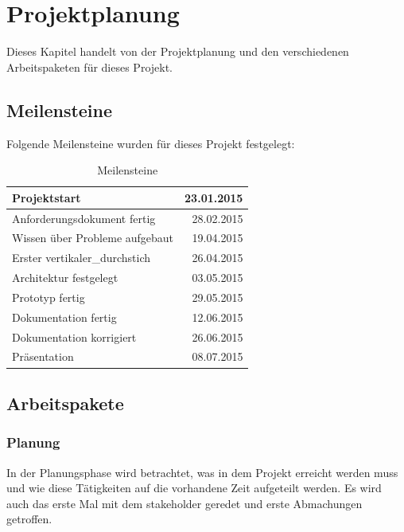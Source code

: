%
%

\chapter{Projektplanung}\label{chap.projektplanung}
Dieses Kapitel handelt von der Projektplanung und den verschiedenen Arbeitspaketen für dieses Projekt.

\section{Meilensteine}\label{meilensteine}
Folgende Meilensteine wurden für dieses Projekt festgelegt:

\begin{table}[ht]
\centering
  \begin{tabular}{ l | r }
	\hline
	\rowcolor{gray}
	\textbf{Projektstart}			&	\textbf{23.01.2015}\\ \hline
	Anforderungsdokument fertig		&	28.02.2015	\\ \hline
	Wissen über Probleme aufgebaut		&	19.04.2015	\\ \hline
	Erster \gls{vertikaler_durchstich}		& 	26.04.2015	\\ \hline
	Architektur festgelegt			&	03.05.2015	\\ \hline
	Prototyp fertig				&	29.05.2015	\\ \hline
	Dokumentation fertig			&	12.06.2015	\\ \hline
	Dokumentation korrigiert			&	26.06.2015	\\ \hline
	Präsentation					&	08.07.2015 \\ \hline
  \end{tabular}
   \caption{Meilensteine}\label{table:milestones}
\end{table}

\section{Arbeitspakete}\label{arbeitspakete}

\subsection{Planung}\label{planung}
In der Planungsphase wird betrachtet, was in dem Projekt erreicht werden muss und wie diese Tätigkeiten auf die vorhandene Zeit aufgeteilt werden. Es wird auch das erste Mal mit dem 
\gls{stakeholder} geredet und erste Abmachungen getroffen.

